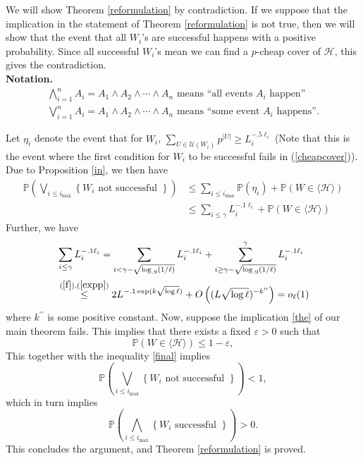 \documentclass[12pt,oneside,reqno]{amsart}
\theoremstyle{definition}
\numberwithin{equation}{theorem}
\newcommand{\cH}{{\mathcal H}}
\begin{document}
We will show Theorem \ref{reformulation} by contradiction. If we suppose that the implication in the statement of Theorem \ref{reformulation} is not true, then we will show that the event that all $W_i$'s are successful happens with a positive probability. Since all successful $W_i$'s mean we can find a $p$-cheap cover of $\cH$, this gives the contradiction. 
\newline
\\
\textbf{Notation.}
\[
\begin{gathered}
\bigwedge_{i=1}^n A_i=A_1 \wedge A_2 \wedge \cdots \wedge A_n
 \text{ means ``all events } A_i \text{ happen''}\\
\bigvee_{i=1}^n A_i=A_1 \wedge A_2 \wedge \cdots \wedge A_n
 \text{ means ``some event } A_i \text{ happens''}.
\end{gathered}
\]

Let $\eta_i$ denote the event that for $W_i$, $\sum_{U \in \mathcal{U}\left(W_{i}\right)} p^{|U|} \geq L_{i}^{-.5 \ell_{i}}$ (Note that this is the event where the first condition for $W_i$ to be successful fails in (\ref{cheapcover})). Due to Proposition \ref{in}, we then have
$$
\begin{aligned}
\mathbb{P}\left(\bigvee_{i \leq i_{\max }}\left\{W_{i} \text { not successful }\right\}\right) & \leq \sum_{i \leq i_{\max }} \mathbb{P}\left(\mathcal{\eta}_{i}\right)+\mathbb{P}(W \in\langle\mathcal{H}\rangle) \\
& \leq \sum_{i \leq \gamma} L_{i}^{-.1 \ell_{i}}+\mathbb{P}(W \in\langle\mathcal{H}\rangle)
\end{aligned}
$$
Further, we have
$$
\begin{aligned}\label{final}
& \sum_{i \leq \gamma} L_{i}^{-.1 \ell_{i}}=\sum_{i<\gamma-\sqrt{\log _{.9}(1 / \ell)}} L_{i}^{-.1 \ell_{i}}+\sum_{i \geq \gamma-\sqrt{\log _{.9}(1 / \ell)}}^{\gamma} L_{i}^{-.1 \ell_{i}} \\
& \stackrel{(\ref{f}),(\ref{expp})}{\leq} 2 L^{-.1 \exp (k \sqrt{\log \ell})}+O\left((L \sqrt{\log \ell})^{-k^{\prime \prime}}\right)=o_{\ell}(1)
\end{aligned}
$$
where $k^{\prime \prime}$ is some positive constant. Now, suppose the implication \ref{the} of our main theorem fails. This implies that there exists a fixed $\varepsilon>0$ such that
$$
\mathbb{P}(W \in\langle\mathcal{H}\rangle) \leq 1-\varepsilon,
$$
This together with the inequality \ref{final} implies 
\[
\mathbb{P}\left(\bigvee_{i \leq i_{\max }}\left\{W_{i} \text { not successful }\right\}\right) < 1,
\]
which in turn implies 
\[
\mathbb{P}\left(\bigwedge_{i \leq i_{\max }}\left\{W_{i} \text { successful }\right\}\right) > 0.
\]
This concludes the argument, and Theorem \ref{reformulation} is proved.
\end{document}
